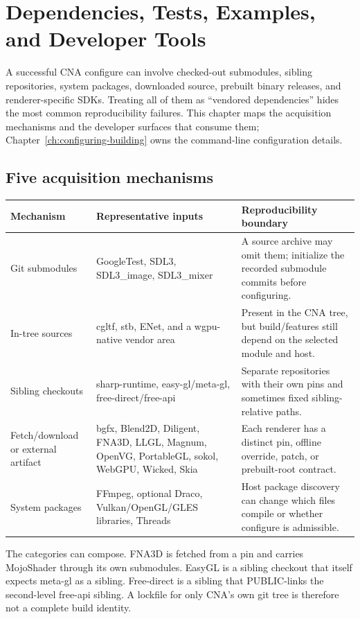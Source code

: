 \chapter{Dependencies, Tests, Examples, and Developer Tools}
\label{ch:dependencies-tools}

A successful CNA configure can involve checked-out submodules, sibling repositories, system
packages, downloaded source, prebuilt binary releases, and renderer-specific SDKs.  Treating all of
them as “vendored dependencies” hides the most common reproducibility failures.  This chapter maps
the acquisition mechanisms and the developer surfaces that consume them; Chapter~\ref{ch:configuring-building}
owns the command-line configuration details.

\section{Five acquisition mechanisms}

\begin{center}
\small
\begin{tabularx}{\textwidth}{lXX}
\toprule
Mechanism & Representative inputs & Reproducibility boundary \\
\midrule
Git submodules & GoogleTest, SDL3, SDL3\_image, SDL3\_mixer & A source archive may omit them;
  initialize the recorded submodule commits before configuring. \\
In-tree sources & cgltf, stb, ENet, and a wgpu-native vendor area & Present in the CNA tree, but
  build/features still depend on the selected module and host. \\
Sibling checkouts & sharp-runtime, easy-gl/meta-gl, free-direct/free-api & Separate repositories
  with their own pins and sometimes fixed sibling-relative paths. \\
Fetch/download or external artifact & bgfx, Blend2D, Diligent, FNA3D, LLGL, Magnum, OpenVG,
  PortableGL, sokol, WebGPU, Wicked, Skia & Each renderer has a distinct pin, offline override,
  patch, or prebuilt-root contract. \\
System packages & FFmpeg, optional Draco, Vulkan/OpenGL/GLES libraries, Threads & Host package
  discovery can change which files compile or whether configure is admissible. \\
\bottomrule
\end{tabularx}
\end{center}

The categories can compose.  FNA3D is fetched from a pin and carries MojoShader through its own
submodules.  EasyGL is a sibling checkout that itself expects meta-gl as a sibling.  Free-direct is
a sibling that PUBLIC-links the second-level free-api sibling.  A lockfile for only CNA's own git
tree is therefore not a complete build identity.

